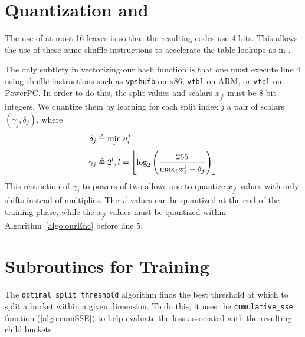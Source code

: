 \section{Quantization and \oursHash} \label{sec:hashQuantize}

The use of at most 16 leaves is so that the resulting codes use 4 bits. This allows the use of these same shuffle instructions to accelerate the table lookups as in \citet{bolt}.

The only subtlety in vectorizing our hash function is that one must execute line 4 using shuffle instructions such as \texttt{vpshufb} on x86, \texttt{vtbl} on ARM, or \texttt{vtbl} on PowerPC. In order to do this, the split values and scalars $x_{j^t}$ must be 8-bit integers. We quantize them by learning for each split index $j$ a pair of scalars $(\gamma_j, \delta_j)$, where
\begin{align}
    \delta_j &\triangleq \min_i \bm{v}^j_i \label{eq:offset} \\
    \gamma_j &\triangleq 2^l, l = \left \lfloor  \log_2 \left( \frac{255}{\max_i \bm{v}^j_i - \delta_j} \right) \label{eq:scale}  \right \rfloor
\end{align}
This restriction of $\gamma_j$ to powers of two allows one to quantize $x_{j^t}$ values with only shifts instead of multiplies. The $\vec{v}$ values can be quantized at the end of the training phase, while the $x_{j^t}$ values must be quantized within Algorithm~\ref{algo:ourEnc} before line 5.

\vfill\break  %
\section{Subroutines for Training \oursHash} \label{sec:optimalSplitVal}

The \texttt{optimal\_split\_threshold} algorithm finds the best threshold at which to split a bucket within a given dimension. To do this, it uses the \texttt{cumulative\_sse} function (\ref{algo:cumSSE}) to help evaluate the loss associated with the resulting child buckets.

